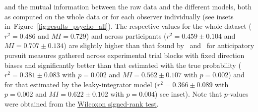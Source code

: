 \documentclass[10pt,letterpaper]{article}
\newcommand{\citet}[1]{\cite{#1}}
\newcommand{\seeFig}[1]{Figure~\ref{fig:#1}}
\begin{document}
and the mutual information
between the raw data and the different models, both as computed on the whole data or
for each observer individually (see insets in~\seeFig{results_psycho_all}).
The respective values for the whole dataset
($r^{2} = 0.486$ and $MI = 0.729$) and across participants
($r^2 = 0.459 \pm 0.104$ and $MI = 0.707 \pm 0.134$)
are slightly higher than that found by~\citet{Montagnini2010} and~\citet{Damasse18}
for anticipatory pursuit measures gathered across experimental trial blocks with fixed direction biases %
and significantly better than that estimated
with the true probability
($r^{2} = 0.381 \pm 0.083$ with $p=0.002$
and $MI = 0.562 \pm 0.107$ with $p=0.002$)
and for that estimated by the leaky-integrator model
($r^{2} = 0.366 \pm 0.089$ with $p=0.002$ and $MI = 0.622 \pm 0.102$ with $p=0.004$)
see inset). Note that $p$-values were obtained from the \href{https://docs.scipy.org/doc/scipy/reference/generated/scipy.stats.wilcoxon.html}{Wilcoxon signed-rank test}.
\end{document}
